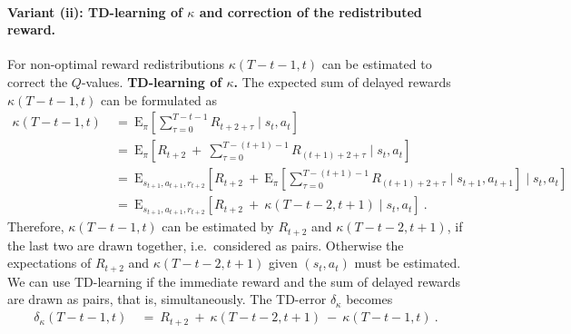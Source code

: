 \documentclass{article}
\newcommand\EXP{\mathbf{\mathrm{E}}}
\begin{document}
\begin{appendices}
\paragraph{Variant (ii): TD-learning of $\kappa$ and correction of the redistributed reward.}
For non-optimal reward redistributions $\kappa(T-t-1,t)$ can be estimated 
to correct the $Q$-values.
{\bf TD-learning of $\kappa$.}
The expected sum of delayed rewards $\kappa(T-t-1,t)$ can be formulated as
\begin{align}
  \kappa(T-t-1,t) \ &= \ 
  \EXP_{\pi} \left[\sum_{\tau=0}^{T-t-1} R_{t+2+\tau} \mid s_t,a_t\right]\\ \nonumber
  &= \ 
  \EXP_{\pi} \left[ R_{t+2} \ + \ \sum_{\tau=0}^{T-(t+1)-1} R_{(t+1)+2+\tau} \mid s_t,a_t\right]\\ \nonumber
  &= \ 
  \EXP_{s_{t+1},a_{t+1},r_{t+2}} \left[ R_{t+2}  \ + \ 
  \EXP_{\pi} \left[\sum_{\tau=0}^{T-(t+1)-1} R_{(t+1)+2+\tau} \mid s_{t+1},a_{t+1}\right] 
  \mid s_t,a_t\right]\\ \nonumber
  &= \ \EXP_{s_{t+1},a_{t+1},r_{t+2}} \left[ R_{t+2}  \ + \ \kappa(T-t-2,t+1) \mid s_t,a_t\right] \ .
\end{align}  
Therefore, $\kappa(T-t-1,t)$ can be estimated by $R_{t+2}$ and $\kappa(T-t-2,t+1)$, 
if the last two are drawn together, 
i.e.\ considered as pairs. 
Otherwise the expectations of $R_{t+2}$ and $\kappa(T-t-2,t+1)$ given
$(s_t,a_t)$ must be estimated.
We can use TD-learning if the immediate reward and 
the sum of delayed rewards are drawn as pairs, that is, simultaneously.  
The TD-error $\delta_{\kappa}$ becomes
\begin{align}
    \delta_{\kappa}(T-t-1,t) \ &= \ R_{t+2}  \ + \ \kappa(T-t-2,t+1) \ - \ \kappa(T-t-1,t) \ .
\end{align}  


\end{appendices}
\end{document}

